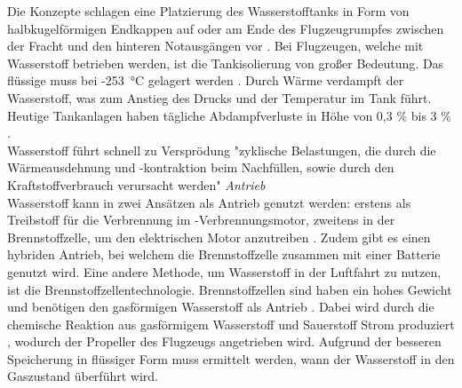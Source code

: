 Die Konzepte schlagen eine Platzierung des Wasserstofftanks in Form von halbkugelförmigen Endkappen auf \cite{dahal2021techno} 
oder am Ende des Flugzeugrumpfes zwischen der Fracht und den hinteren Notausgängen vor \cite{rietdijk2024architecture}.
Bei Flugzeugen, welche mit Wasserstoff betrieben werden, ist die Tankisolierung von großer Bedeutung. 
Das flüssige  muss bei -253 °C gelagert werden \cite{colpan2022fuel}. 
Durch Wärme verdampft der Wasserstoff, was zum Anstieg des Drucks und der Temperatur im Tank führt. Heutige Tankanlagen 
haben tägliche Abdampfverluste in Höhe von 0,3 \% bis 3 \% \cite{eichlseder2012hydrogen}.\\

Wasserstoff führt schnell zu Versprödung \cite{dahal2021techno}
"zyklische Belastungen, die durch die Wärmeausdehnung und -kontraktion beim Nachfüllen, sowie durch den Kraftstoffverbrauch verursacht werden"
%
%
%
\textit{Antrieb}\\
Wasserstoff kann in zwei Ansätzen als Antrieb genutzt werden: 
erstens als Treibstoff für die Verbrennung im -Verbrennungsmotor,
zweitens in der Brennstoffzelle, um den elektrischen Motor anzutreiben \cite{sky2020hydrogen}. 
Zudem gibt es einen hybriden Antrieb, bei welchem die Brennstoffzelle zusammen mit einer Batterie genutzt wird.
%
Eine andere Methode, um Wasserstoff in der Luftfahrt zu nutzen, ist die Brennstoffzellentechnologie.
Brennstoffzellen sind haben ein hohes Gewicht \cite{hepperle2012electric} und 
benötigen den gasförmigen Wasserstoff als Antrieb \cite{colpan2022fuel}.
Dabei wird durch die chemische Reaktion aus gasförmigem Wasserstoff  und Sauerstoff  Strom produziert \cite{dalmia2022powering}, 
wodurch der Propeller des Flugzeugs angetrieben wird. Aufgrund der besseren Speicherung in flüssiger Form muss ermittelt werden, wann der Wasserstoff in den Gaszustand überführt wird. 
%
%

